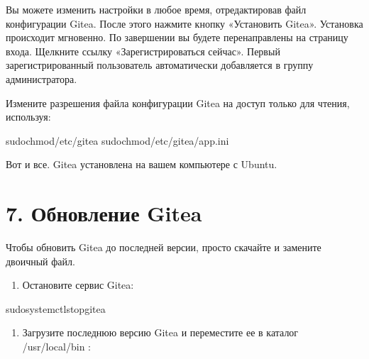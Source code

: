 \documentclass[a4paper,10pt,russian]{report}
\begin{document}
\sphinxAtStartPar
Вы можете изменить настройки в любое время, отредактировав файл конфигурации Gitea.
После этого нажмите кнопку «Установить Gitea». Установка происходит мгновенно.
По завершении вы будете перенаправлены на страницу входа.
Щелкните ссылку «Зарегистрироваться сейчас». Первый зарегистрированный пользователь
автоматически добавляется в группу администратора.

\sphinxAtStartPar
Измените разрешения файла конфигурации Gitea на доступ только для чтения, используя:

\begin{sphinxVerbatim}[commandchars=\\\{\}]
\PYGZdl{}sudochmod/etc/gitea
\PYGZdl{}sudochmod/etc/gitea/app.ini
\end{sphinxVerbatim}

\sphinxAtStartPar
Вот и все. Gitea установлена на вашем компьютере с Ubuntu.


\section{7. Обновление Gitea}
\label{\detokenize{git:id6}}
\sphinxAtStartPar
Чтобы обновить Gitea до последней версии, просто скачайте и замените двоичный файл.
\begin{enumerate}
%
\item {} 
\sphinxAtStartPar
Остановите сервис Gitea:

\end{enumerate}

\begin{sphinxVerbatim}[commandchars=\\\{\}]
\PYGZdl{}sudosystemctlstopgitea
\end{sphinxVerbatim}
\begin{enumerate}
%
\setcounter{enumi}{1}
\item {} 
\sphinxAtStartPar
Загрузите последнюю версию Gitea и переместите ее в каталог /usr/local/bin :

\end{enumerate}
\end{document}
